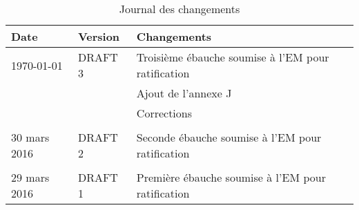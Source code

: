 
%

\begin{table}[h]

	\centering

	\begin{tabularx}{\textwidth}{ @{} p{4cm} p{3cm} X @{} }

		\textbf{Date} & \textbf{Version} & \textbf{Changements}\\ \toprule
		
		\today{} & DRAFT 3 & Troisième ébauche soumise à l'EM pour ratification\\
		
		&&Ajout de l'annexe J\\
		&&Corrections\\
		
		
		\hrulefill&\hrulefill&\hrulefill\\
		
		30 mars 2016 & DRAFT 2 & Seconde ébauche soumise à l'EM pour ratification\\
		
		\hrulefill&\hrulefill&\hrulefill\\

		29 mars 2016 & DRAFT 1 & Première ébauche soumise à l'EM pour ratification\\
		
		\bottomrule
		

	\end{tabularx}

	\caption[Changements]{Journal des changements}

	\label{record-of-changes}

\end{table} 